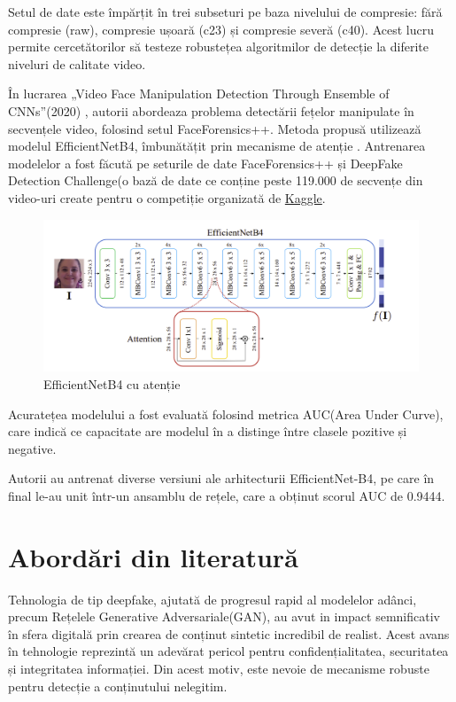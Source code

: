 Setul de date este împărțit în trei subseturi pe baza nivelului de compresie: fără compresie (raw), compresie ușoară (c23) și compresie severă (c40). Acest lucru permite cercetătorilor să testeze robustețea algoritmilor de detecție la diferite niveluri de calitate video.

În lucrarea „Video Face Manipulation Detection Through Ensemble of CNNs”(2020) \cite{bonettini2020video}, autorii abordeaza problema detectării fețelor manipulate în secvențele video, folosind setul FaceForensics++.  Metoda propusă utilizează modelul EfficientNetB4\cite{tan2019efficientnet}, îmbunătățit prin mecanisme de atenție \cite{vaswani2017attention}. Antrenarea modelelor a fost făcută pe seturile de date FaceForensics++ și DeepFake Detection Challenge(o bază de date ce conține peste 119.000 de secvențe din video-uri create pentru o competiție organizată de \href{https://www.kaggle.com/}{Kaggle}. 

\begin{figure}[h]
     \centering 
     \includegraphics[width=\linewidth]{images/efficientnetb4.png}
     \captionsetup{font=footnotesize}
     \caption{EfficientNetB4 cu atenție \cite{bonettini2020video}}
\end{figure}

Acuratețea modelului a fost evaluată folosind metrica AUC(Area Under Curve), care indică ce capacitate are modelul în a distinge între clasele pozitive și negative.

Autorii au antrenat diverse versiuni ale arhitecturii EfficientNet-B4, pe care în final le-au unit într-un ansamblu de rețele, care a obținut scorul AUC de 0.9444. 

\chapter{Abordări din literatură}

Tehnologia de tip deepfake, ajutată de progresul rapid al modelelor adânci, precum Rețelele Generative Adversariale(GAN), au avut in impact semnificativ în sfera digitală prin crearea de conținut sintetic incredibil de realist. Acest avans în tehnologie reprezintă un adevărat pericol pentru confidențialitatea, securitatea și integritatea informației. Din acest motiv, este nevoie de mecanisme robuste pentru detecție a conținutului nelegitim. 

